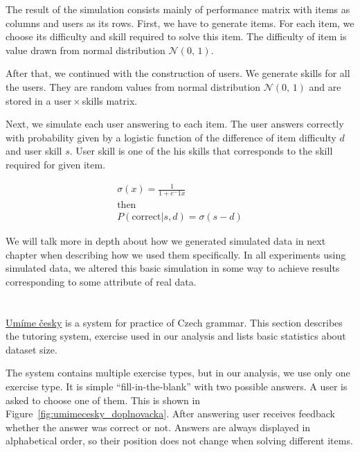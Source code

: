 \documentclass[
  printed, %
  table,   %
  nolof,     %
  nolot,     %
  color,
  final,
  nocover
]{fithesis3}
\begin{document}
The result of the simulation consists mainly of performance matrix with items as columns and users as its rows. First, we have to generate items. For each item, we choose its difficulty and skill required to solve this item. The difficulty of item is value drawn from normal distribution $\mathcal{N}(0,\,1)$.

After that, we continued with the construction of users. We generate skills for all the users. They are random values from normal distribution $\mathcal{N}(0,\,1)$ and are stored in a user\,$\times$\,skills matrix.

Next, we simulate each user answering to each item. The user answers correctly with probability given by a logistic function of the difference of item difficulty $d$ and user skill $s$. User skill is one of the his skills that corresponds to the skill required for given item.

\begin{gather*}
\sigma(x) = \frac{1}{1 + e^-1x} \\
\text{then}\\
P(\text{correct}|s, d) = \sigma(s - d)
\end{gather*}

We will talk more in depth about how we generated simulated data in next chapter when describing how we used them specifically. In all experiments using simulated data, we altered this basic simulation in some way to achieve results corresponding to some attribute of real data.


\section{\umimeCesky{}}\label{umime-cesky}


\href{https://umimecesky.cz/}{Umíme česky} is a system for practice of Czech grammar. This section describes the tutoring system, exercise used in our analysis and lists basic statistics about dataset size.

The system contains multiple exercise types, but in our analysis, we use only one exercise type. It is simple ``fill-in-the-blank'' with two possible answers. A user is asked to choose one of them. This is shown in Figure~\ref{fig:umimecesky_doplnovacka}. After answering user receives feedback whether the answer was correct or not. Answers are always displayed in alphabetical order, so their position does not change when solving different items.
\end{document}
